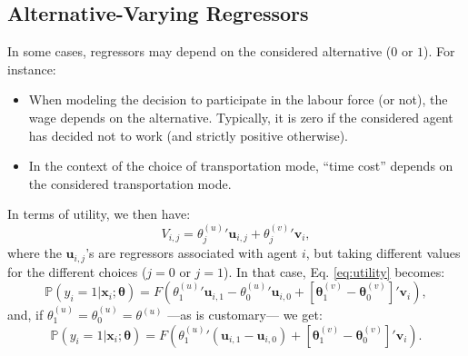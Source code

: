 \documentclass[
  12pt,
]{book}
\providecommand{\tightlist}{%
  \setlength{\itemsep}{0pt}\setlength{\parskip}{0pt}}
\theoremstyle{definition}
\theoremstyle{definition}
\theoremstyle{definition}
\theoremstyle{definition}
\theoremstyle{remark}
\begin{document}
\hypertarget{Avregressors}{%
\subsection{Alternative-Varying Regressors}\label{Avregressors}}

In some cases, regressors may depend on the considered alternative (\(0\) or \(1\)). For instance:

\begin{itemize}
\tightlist
\item
  When modeling the decision to participate in the labour force (or not), the wage depends on the alternative. Typically, it is zero if the considered agent has decided not to work (and strictly positive otherwise).
\item
  In the context of the choice of transportation mode, ``time cost'' depends on the considered transportation mode.
\end{itemize}

In terms of utility, we then have:
\[
V_{i,j} = {\theta^{(u)}_{j}}'\mathbf{u}_{i,j} + {\theta^{(v)}_{j}}'\mathbf{v}_{i},
\]
where the \(\mathbf{u}_{i,j}\)'s are regressors associated with agent \(i\), but taking different values for the different choices (\(j=0\) or \(j=1\)). In that case, Eq. \eqref{eq:utility} becomes:
\begin{equation}
\mathbb{P}(y_i = 1|\mathbf{x}_i;\boldsymbol\theta)  = F\left({\theta^{(u)}_{1}}'\mathbf{u}_{i,1}-{\theta^{(u)}_{0}}'\mathbf{u}_{i,0}+[\boldsymbol\theta_1^{(v)}-\boldsymbol\theta_0^{(v)}]'\mathbf{v}_i\right),\label{eq:utility2}
\end{equation}
and, if \(\theta^{(u)}_{1}=\theta^{(u)}_{0}=\theta^{(u)}\) ---as is customary--- we get:
\begin{equation}
\mathbb{P}(y_i = 1|\mathbf{x}_i;\boldsymbol\theta)  = F\left({\theta^{(u)}_{1}}'(\mathbf{u}_{i,1}-\mathbf{u}_{i,0})+[\boldsymbol\theta_1^{(v)}-\boldsymbol\theta_0^{(v)}]'\mathbf{v}_i\right).\label{eq:utility3}
\end{equation}
\end{document}
